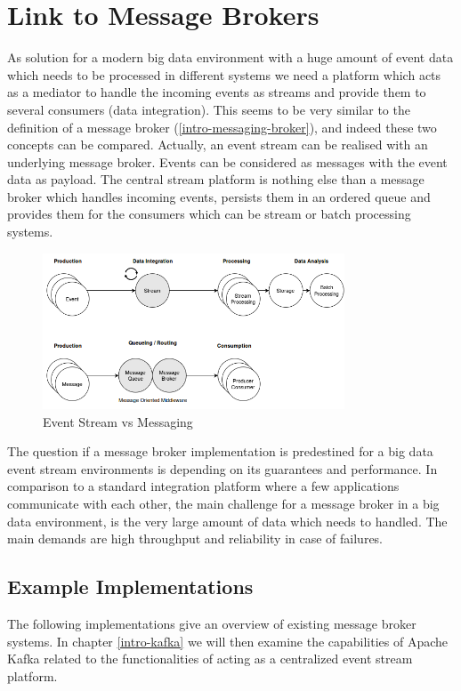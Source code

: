 \section{Link to Message Brokers}
As solution for a modern big data environment with a huge amount of event data
which needs to be processed in different systems we need a platform which acts as
a mediator to handle the incoming events as streams and provide them to several
consumers (data integration). This seems to be very similar to
the definition of a message broker (\ref{intro-messaging-broker}), and indeed
these two concepts can be compared. Actually, an event stream can be realised
with an underlying message broker. Events can be considered as messages with the
event data as payload. The central stream platform is nothing else than a
message broker which handles incoming events, persists them in an ordered queue
and provides them for the consumers which can be stream or batch processing
systems.
\begin{figure}[H]
    \centering
    \includegraphics[width=0.8\textwidth]{images/messaging-vs-streaming.png}
    \caption{Event Stream vs Messaging}
    \label{fig:messaging-vs-streaming}
\end{figure}
The question if a message broker implementation is predestined for a big data
event stream environments is depending on its guarantees and performance. In
comparison to a standard integration platform where a few applications communicate with each
other, the main challenge for a message broker in a big data environment, is the
very large amount of data which needs to handled. The main demands are high
throughput and reliability in case of failures. 


\subsection{Example Implementations}

The following implementations give an overview of existing message broker systems.
In chapter \ref{intro-kafka} we will then examine the capabilities of Apache
Kafka related to the functionalities of acting as a centralized event stream
platform.

